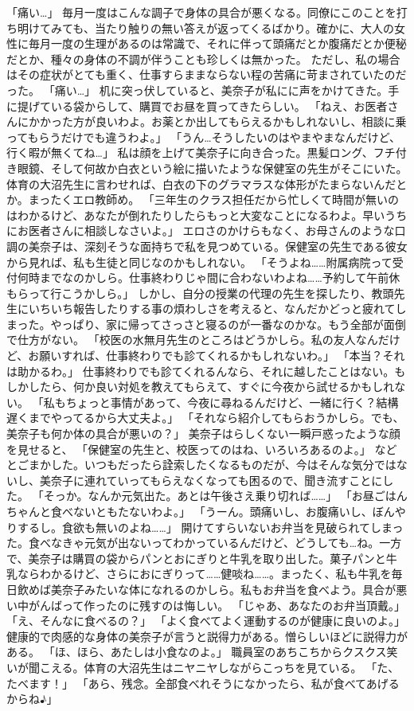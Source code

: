 「痛い…」
毎月一度はこんな調子で身体の具合が悪くなる。同僚にこのことを打ち明けてみても、当たり触りの無い答えが返ってくるばかり。確かに、大人の女性に毎月一度の生理があるのは常識で、それに伴って頭痛だとか腹痛だとか便秘だとか、種々の身体の不調が伴うことも珍しくは無かった。
ただし、私の場合はその症状がとても重く、仕事すらままならない程の苦痛に苛まされていたのだった。
「痛い…」
机に突っ伏していると、美奈子が私にに声をかけてきた。手に提げている袋からして、購買でお昼を買ってきたらしい。
「ねえ、お医者さんにかかった方が良いわよ。お薬とか出してもらえるかもしれないし、相談に乗ってもらうだけでも違うわよ。」
「うん…そうしたいのはやまやまなんだけど、行く暇が無くてね…」
私は顔を上げて美奈子に向き合った。黒髪ロング、フチ付き眼鏡、そして何故か白衣という絵に描いたような保健室の先生がそこにいた。体育の大沼先生に言わせれば、白衣の下のグラマラスな体形がたまらないんだとか。まったくエロ教師め。
「三年生のクラス担任だから忙しくて時間が無いのはわかるけど、あなたが倒れたりしたらもっと大変なことになるわよ。早いうちにお医者さんに相談しなさいよ。」
エロさのかけらもなく、お母さんのような口調の美奈子は、深刻そうな面持ちで私を見つめている。保健室の先生である彼女から見れば、私も生徒と同じなのかもしれない。
「そうよね……附属病院って受付何時までなのかしら。仕事終わりじゃ間に合わないわよね……予約して午前休もらって行こうかしら。」
しかし、自分の授業の代理の先生を探したり、教頭先生にいちいち報告したりする事の煩わしさを考えると、なんだかどっと疲れてしまった。やっぱり、家に帰ってさっさと寝るのが一番なのかな。もう全部が面倒で仕方がない。
「校医の水無月先生のところはどうかしら。私の友人なんだけど、お願いすれば、仕事終わりでも診てくれるかもしれないわ。」
「本当？それは助かるわ。」
仕事終わりでも診てくれるんなら、それに越したことはない。もしかしたら、何か良い対処を教えてもらえて、すぐに今夜から試せるかもしれない。
「私もちょっと事情があって、今夜に尋ねるんだけど、一緒に行く？結構遅くまでやってるから大丈夫よ。」
「それなら紹介してもらおうかしら。でも、美奈子も何か体の具合が悪いの？」
美奈子はらしくない一瞬戸惑ったような顔を見せると、
「保健室の先生と、校医ってのはね、いろいろあるのよ。」
などとごまかした。いつもだったら詮索したくなるものだが、今はそんな気分ではないし、美奈子に連れていってもらえなくなっても困るので、聞き流すことにした。
「そっか。なんか元気出た。あとは午後さえ乗り切れば……」
「お昼ごはんちゃんと食べないともたないわよ。」
「うーん。頭痛いし、お腹痛いし、ぼんやりするし。食欲も無いのよね……」
開けてすらいないお弁当を見破られてしまった。食べなきゃ元気が出ないってわかっているんだけど、どうしても…ね。一方で、美奈子は購買の袋からパンとおにぎりと牛乳を取り出した。菓子パンと牛乳ならわかるけど、さらにおにぎりって……健啖ね……。まったく、私も牛乳を毎日飲めば美奈子みたいな体になれるのかしら。私もお弁当を食べよう。具合が悪い中がんばって作ったのに残すのは悔しい。
「じゃあ、あなたのお弁当頂戴。」
「え、そんなに食べるの？」
「よく食べてよく運動するのが健康に良いのよ。」
健康的で肉感的な身体の美奈子が言うと説得力がある。憎らしいほどに説得力がある。
「ほ、ほら、あたしは小食なのよ。」
職員室のあちこちからクスクス笑いが聞こえる。体育の大沼先生はニヤニヤしながらこっちを見ている。
「た、たべます！」
「あら、残念。全部食べれそうになかったら、私が食べてあげるからね♪」



